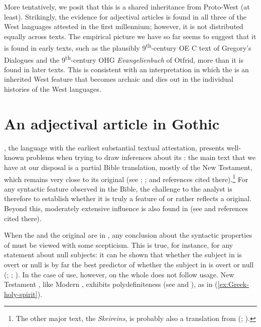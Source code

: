 \documentclass[output=paper,colorlinks,citecolor=brown]{langscibook}
\begin{document}
More tentatively, we posit that this is a shared inheritance from Proto-West  (at least). Strikingly, the evidence for adjectival articles is found in all three of the West  languages attested in the first millennium; however, it is not distributed equally across texts. The empirical picture we have so far seems to suggest that it is found in early texts, such as the plausibly 9\textsuperscript{th}-century OE C text of Gregory's Dialogues and the 9\textsuperscript{th}-century OHG \emph{Evangelienbuch} of Otfrid, more than it is found in later texts. This is consistent with an interpretation in which the  is an inherited West  feature that becomes archaic and dies out in the individual histories of the West  languages.





\section{An adjectival article in Gothic}\label{sec:9:gothic}

, the  language with the earliest substantial textual attestation, presents well-known problems when trying to draw inferences about its : the main text that we have at our disposal is a partial Bible translation, mostly of the New Testament, which remains very close to its  original (see \citealp[21--39]{ratkus2011}; \citealp[11--13]{Walkden2014book}; \citealp[8--20]{Miller2019} and references cited there).\footnote{The other major  text, the \emph{Skeireins}, is probably also a translation from  (\citealt{Bennett1960}; \citealt{Schaeferdiek1981}).} For any syntactic feature observed in the  Bible, the challenge to the analyst is therefore to establish whether it is truly a feature of  or rather reflects a  original. Beyond this, moderately extensive  influence is also found in  (see \citealp[chapter 5]{Falluomini2015} and references cited there).

When the  and the  original are in , any conclusion about the syntactic properties of  must be viewed with some scepticism. This is true, for instance, for any statement about null subjects: it can be shown that whether the subject in  is overt or null is by far the best predictor of whether the subject in  is overt or null (\citealp{Fertig2000}; \citealp{Ferraresi2005}; \citealp[chapter 5]{Walkden2014book}). In the case of  use, however,  on the whole does not follow  usage. New Testament , like Modern , exhibits polydefiniteness (see \citealp{Ramaglia2008} and \citealp{Leu2007greek}), as in (\ref{ex:Greek-holy-spirit}).
\end{document}

